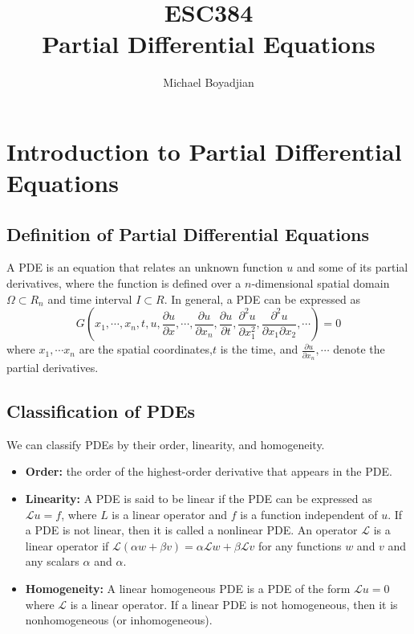 \documentclass[11pt]{article}
\newcommand{\Lagr}{\mathcal{L}}
\begin{document}
\title{ESC384  \\ Partial Differential Equations}
\author{Michael Boyadjian}
\maketitle
\pagebreak

\tableofcontents

\pagebreak

\bigskip
\bigskip
\bigskip

\section{Introduction to Partial Differential Equations}

\subsection{Definition of Partial Differential Equations}
A PDE is an equation that relates an unknown function $u$ and some of its partial derivatives, where the function is defined over a $n$-dimensional spatial domain $\Omega \subset R_n$ and time interval $I \subset R$. In general, a PDE can be expressed as
$$ G \left( x_1, \cdots, x_n,t,u,\frac{\partial u}{\partial x}, \cdots, \frac{\partial u}{\partial x_n},  \frac{\partial u}{\partial t}, \frac{\partial^2 u }{\partial x_1^2}, \frac{\partial^2 u }{\partial x_1 \partial x_2}, \cdots \right) = 0$$
where $x_1,  \cdots x_n$ are the spatial coordinates,$t$ is the time, and $\frac{\partial u}{\partial x_n}, \cdots$ denote the partial derivatives.  


\subsection{Classification of PDEs}
We can classify PDEs by their order, linearity, and homogeneity. 
\begin{itemize}
\item \textbf{Order:}  the order of the highest-order derivative that appears in the PDE.
\item \textbf{Linearity:} A PDE is said to be linear if the PDE can be expressed as $ \Lagr u = f$, where $L$ is a linear operator and $f$ is a function independent of $u$. If a PDE is not linear, then it
is called a nonlinear PDE.  An operator $\Lagr$ is a linear operator if $\Lagr(\alpha w + \beta v) = \alpha \Lagr w + \beta \Lagr v $
for any functions $w$ and $v$ and any scalars $\alpha$ and $\alpha$.
\item \textbf{Homogeneity:} A linear homogeneous PDE is a PDE of the form $\Lagr u = 0$ where $\Lagr$ is a linear operator.  If a linear PDE is not homogeneous, then it is nonhomogeneous (or inhomogeneous).
\end{itemize}
\end{document}
